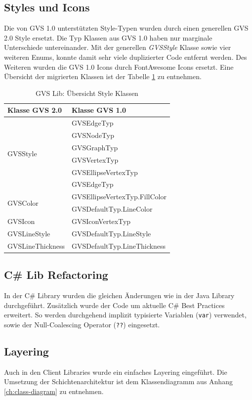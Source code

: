 \documentclass[11pt,a4paper,english,oneside]{book}
\numberwithin{equation}{chapter}
\begin{document}
	\subsection{Styles und Icons}
	Die von GVS 1.0 unterstützten Style-Typen wurden durch einen generellen GVS 2.0 Style ersetzt. Die Typ Klassen aus GVS 1.0 haben nur marginale Unterschiede untereinander. Mit der generellen \textit{GVSStyle} Klasse sowie vier weiteren Enums, konnte damit sehr viele duplizierter Code entfernt werden. Des Weiteren wurden die GVS 1.0 Icons durch FontAwesome Icons ersetzt. Eine Übersicht der migrierten Klassen ist der Tabelle \ref{tbl:styles} zu entnehmen.
	
	\begin{table}[h!]
		\centering
		\begin{tabularx}{\linewidth}{X X}
			\toprule 
			Klasse GVS 2.0 & Klasse GVS 1.0\\
			\midrule
			\multirow{6}{*}{GVSStyle} & 
			GVSEdgeTyp \\ & 
			GVSNodeTyp \\ & 
			GVSGraphTyp  \\ &
			GVSVertexTyp  \\ &
			GVSEllipseVertexTyp \\ &
			GVSEdgeTyp \\
			\midrule
			\multirow{2}{*}{GVSColor} & GVSEllipseVertexTyp.FillColor \\ &
			GVSDefaultTyp.LineColor \\
			\midrule
			GVSIcon & GVSIconVertexTyp \\
			\midrule
			GVSLineStyle & GVSDefaultTyp.LineStyle \\
			\midrule
			GVSLineThickness & GVSDefaultTyp.LineThickness \\
			\bottomrule 
		\end{tabularx} 
		\caption{GVS Lib: Übersicht Style Klassen} 
		\label{tbl:styles}
	\end{table}
	
	\subsection{C\# Lib Refactoring}
	In der C\# Library wurden die gleichen Änderungen wie in der Java Library durchgeführt. Zusätzlich wurde der Code um aktuelle C\# Best Practices erweitert. So werden durchgehend implizit typisierte Variablen (\lstinline|var|) verwendet, sowie der Null-Coalescing Operator (\lstinline|??|) eingesetzt. 
	
	\subsection{Layering}
	Auch in den Client Libraries wurde ein einfaches Layering eingeführt. Die Umsetzung der Schichtenarchitektur ist dem Klassendiagramm aus Anhang \ref{ch:class-diagram} zu entnehmen.	
\end{document}
